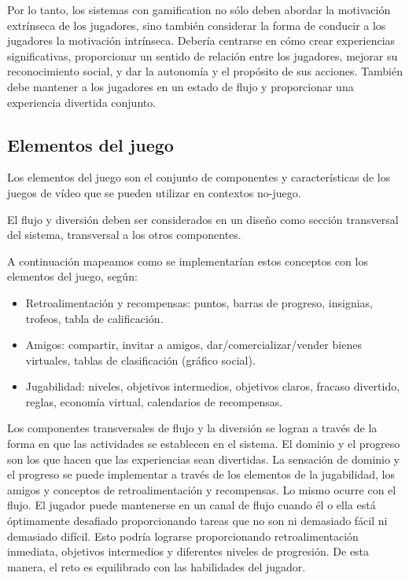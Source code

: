 Por lo tanto, los sistemas con gamification no sólo deben abordar la motivación extrínseca de los jugadores, sino también considerar la forma de conducir a los jugadores la motivación intrínseca. Debería centrarse en cómo crear experiencias significativas, proporcionar un sentido de relación entre los jugadores, mejorar su reconocimiento social, y dar la autonomía y el propósito de sus acciones. También debe mantener a los jugadores en un estado de flujo y proporcionar una experiencia divertida conjunto\cite{framework:gamification}. 


\subsection{Elementos del juego}

Los elementos del juego son el conjunto de componentes y características de los juegos de vídeo que se pueden utilizar en contextos no-juego\cite{framework:gamification}.

El flujo y diversión deben ser considerados en un diseño como sección transversal del sistema, transversal a los otros componentes\cite{framework:gamification}.

A continuación mapeamos como se implementarían estos conceptos con los elementos del juego, según\cite{framework:gamification}:

\begin{itemize}
	\item Retroalimentación y recompensas: puntos, barras de progreso, insignias, trofeos, tabla de calificación.
	\item Amigos: compartir, invitar a amigos, dar/comercializar/vender bienes virtuales, tablas de clasificación (gráfico social).
	\item Jugabilidad: niveles, objetivos intermedios, objetivos claros, fracaso divertido, reglas, economía virtual, calendarios de recompensas.
\end{itemize}

Los componentes transversales de flujo y la diversión se logran a través de la forma en que las actividades se establecen en el sistema. El dominio y el progreso son los que hacen que las experiencias sean divertidas. La sensación de dominio y el progreso se puede implementar a través de los elementos de la jugabilidad, los amigos y conceptos de retroalimentación y recompensas. Lo mismo ocurre con el flujo. El jugador puede mantenerse en un canal de flujo cuando él o ella está óptimamente desafiado proporcionando tareas que no son ni demasiado fácil ni demasiado difícil. Esto podría lograrse proporcionando retroalimentación inmediata, objetivos intermedios y diferentes niveles de progresión. De esta manera, el reto es equilibrado con las habilidades del jugador\cite{framework:gamification}.
